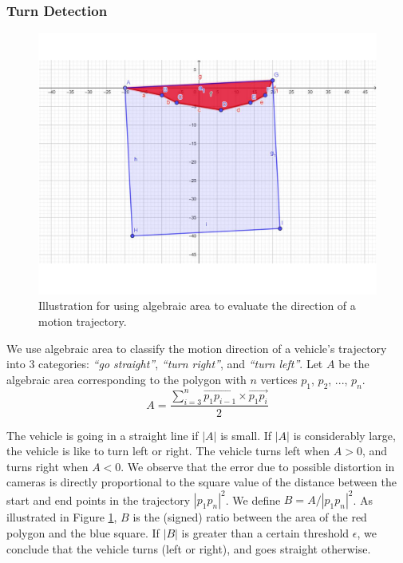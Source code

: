 \subsubsection{Turn Detection}
\begin{figure}[!htb]
    \centering
    \includegraphics[width=\linewidth]{images/methods/SignedArea_foxit.pdf}
    \caption{Illustration for using algebraic area to evaluate the direction of a motion trajectory.}
    \label{fig:signed_area}
\end{figure}
We use algebraic area to classify the motion direction of a vehicle's trajectory into 3 categories:  \emph{``go straight''},  \emph{``turn right''}, and \emph{``turn left''}. 
Let $A$ be the algebraic area corresponding to the polygon with $n$ vertices $p_1$, $p_2$, ..., $p_n$. 
\[
A = \frac{{\sum\nolimits_{i = 3}^n {\overrightarrow {p_1 p_{i - 1} }  \times \overrightarrow {p_1 p_i } } }}{2}
\]

The vehicle is going in a straight line if $|A|$ is small. If $|A|$ is considerably large, the vehicle is like to turn left or right. The vehicle turns left when $A > 0$, and turns right when $A < 0$.
We observe that the error due to possible distortion in cameras is directly proportional to the square value of the distance between the start and end points in the trajectory $|p_1p_n|^2$.
We define $B = A/|p_1p_n|^2$. As illustrated in Figure \ref{fig:signed_area}, $B$ is the (signed) ratio between the area of the red polygon and the blue square. If $|B|$ is greater than a certain threshold $\epsilon$, we conclude that the vehicle turns (left or right), and goes straight otherwise.
